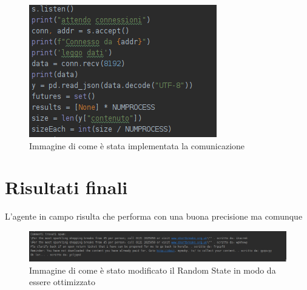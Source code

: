 \documentclass{report}
\begin{document}
    \begin{figure}[h!]
        \centering
        \includegraphics[width =\textwidth]{immagini/socket.png}
        \caption{Immagine di come è stata implementata la comunicazione}

    \end{figure}
    
    \section{Risultati finali}
    L'agente in campo risulta che performa con una buona precisione ma comunque 

    \begin{figure}[h!]
        \centering
        \includegraphics[width =\textwidth]{immagini/commentiSpam.png}
        \caption{Immagine di come è stato modificato il Random State in modo da essere ottimizzato}

\end{figure}
\end{document}
